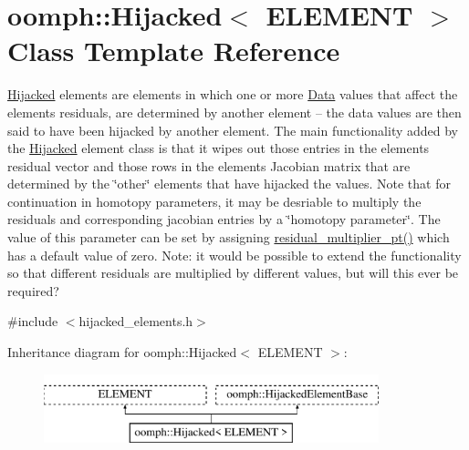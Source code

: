 \hypertarget{classoomph_1_1Hijacked}{}\section{oomph\+:\+:Hijacked$<$ E\+L\+E\+M\+E\+NT $>$ Class Template Reference}
\label{classoomph_1_1Hijacked}


\hyperlink{classoomph_1_1Hijacked}{Hijacked} elements are elements in which one or more \hyperlink{classoomph_1_1Data}{Data} values that affect the element\textquotesingle{}s residuals, are determined by another element -- the data values are then said to have been hijacked by another element. The main functionality added by the \hyperlink{classoomph_1_1Hijacked}{Hijacked} element class is that it wipes out those entries in the element\textquotesingle{}s residual vector and those rows in the element\textquotesingle{}s Jacobian matrix that are determined by the \char`\"{}other\char`\"{} elements that have hijacked the values. Note that for continuation in homotopy parameters, it may be desriable to multiply the residuals and corresponding jacobian entries by a \char`\"{}homotopy parameter\char`\"{}. The value of this parameter can be set by assigning \hyperlink{classoomph_1_1HijackedElementBase_affdb1888fb6b2de051bc0345e6f5d934}{residual\+\_\+multiplier\+\_\+pt()} which has a default value of zero. Note\+: it would be possible to extend the functionality so that different residuals are multiplied by different values, but will this ever be required?  




{\ttfamily \#include $<$hijacked\+\_\+elements.\+h$>$}

Inheritance diagram for oomph\+:\+:Hijacked$<$ E\+L\+E\+M\+E\+NT $>$\+:\begin{figure}[H]
\begin{center}
\leavevmode
\includegraphics[height=2.000000cm]{classoomph_1_1Hijacked}
\end{center}
\end{figure}
